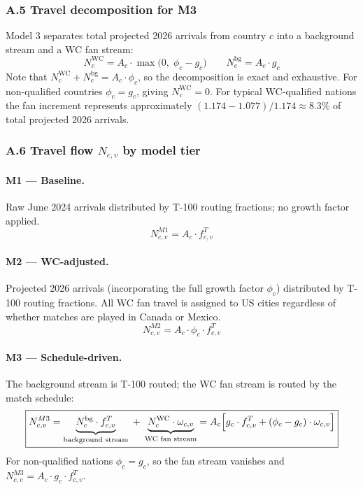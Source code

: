 \documentclass[12pt, a4paper]{article}
\begin{document}
\subsubsection*{A.5 Travel decomposition for M3}

Model 3 separates total projected 2026 arrivals from country $c$
into a background stream and a WC fan stream:
\[
  N_c^{\text{WC}} = A_c \cdot \max\!\bigl(0,\;\phi_c - g_c\bigr)
  \qquad
  N_c^{\text{bg}} = A_c \cdot g_c
\]
Note that $N_c^{\text{WC}} + N_c^{\text{bg}} = A_c \cdot \phi_c$,
so the decomposition is exact and exhaustive. For non-qualified
countries $\phi_c = g_c$, giving $N_c^{\text{WC}} = 0$. For
typical WC-qualified nations the fan increment represents
approximately $(1.174 - 1.077)/1.174 \approx 8.3\%$ of total
projected 2026 arrivals.

\subsubsection*{A.6 Travel flow $N_{c,v}$ by model tier}

\paragraph{M1 --- Baseline.}
Raw June 2024 arrivals distributed by T-100 routing fractions;
no growth factor applied.
\[
  \boxed{N_{c,v}^{M1} = A_c \cdot f_{c,v}^{T}}
\]

\paragraph{M2 --- WC-adjusted.}
Projected 2026 arrivals (incorporating the full growth factor
$\phi_c$) distributed by T-100 routing fractions. All WC fan
travel is assigned to US cities regardless of whether matches
are played in Canada or Mexico.
\[
  \boxed{N_{c,v}^{M2} = A_c \cdot \phi_c \cdot f_{c,v}^{T}}
\]

\paragraph{M3 --- Schedule-driven.}
The background stream is T-100 routed; the WC fan stream is
routed by the match schedule:
\[
  \boxed{N_{c,v}^{M3}
    = \underbrace{N_c^{\text{bg}} \cdot f_{c,v}^{T}}_{\text{background stream}}
      \;+\;
      \underbrace{N_c^{\text{WC}} \cdot \omega_{c,v}}_{\text{WC fan stream}}
    = A_c \Bigl[
        g_c \cdot f_{c,v}^{T}
        + (\phi_c - g_c) \cdot \omega_{c,v}
      \Bigr]}
\]
For non-qualified nations $\phi_c = g_c$, so the fan stream
vanishes and $N_{c,v}^{M3} = A_c \cdot g_c \cdot f_{c,v}^{T}$.
\end{document}
